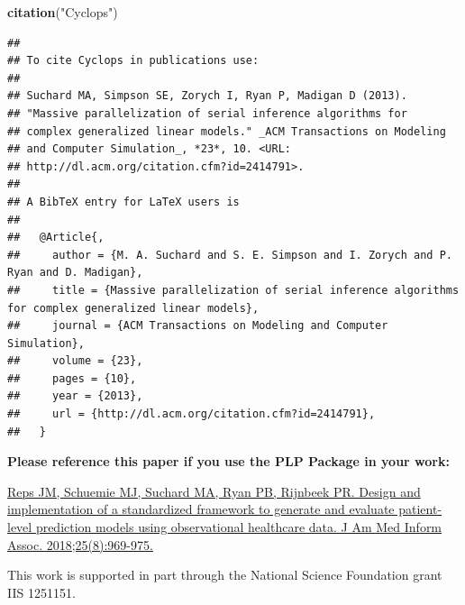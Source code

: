 \documentclass[]{article}
\newenvironment{Shaded}{\begin{snugshade}}{\end{snugshade}}
\newcommand{\KeywordTok}[1]{\textcolor[rgb]{0.13,0.29,0.53}{\textbf{#1}}}
\newcommand{\StringTok}[1]{\textcolor[rgb]{0.31,0.60,0.02}{#1}}
\newcommand{\NormalTok}[1]{#1}
\begin{document}
\begin{Shaded}
\begin{Highlighting}[]
\KeywordTok{citation}\NormalTok{(}\StringTok{"Cyclops"}\NormalTok{)}
\end{Highlighting}
\end{Shaded}

\begin{verbatim}
## 
## To cite Cyclops in publications use:
## 
## Suchard MA, Simpson SE, Zorych I, Ryan P, Madigan D (2013).
## "Massive parallelization of serial inference algorithms for
## complex generalized linear models." _ACM Transactions on Modeling
## and Computer Simulation_, *23*, 10. <URL:
## http://dl.acm.org/citation.cfm?id=2414791>.
## 
## A BibTeX entry for LaTeX users is
## 
##   @Article{,
##     author = {M. A. Suchard and S. E. Simpson and I. Zorych and P. Ryan and D. Madigan},
##     title = {Massive parallelization of serial inference algorithms for complex generalized linear models},
##     journal = {ACM Transactions on Modeling and Computer Simulation},
##     volume = {23},
##     pages = {10},
##     year = {2013},
##     url = {http://dl.acm.org/citation.cfm?id=2414791},
##   }
\end{verbatim}

\textbf{Please reference this paper if you use the PLP Package in your
work:}

\href{http://dx.doi.org/10.1093/jamia/ocy032}{Reps JM, Schuemie MJ,
Suchard MA, Ryan PB, Rijnbeek PR. Design and implementation of a
standardized framework to generate and evaluate patient-level prediction
models using observational healthcare data. J Am Med Inform Assoc.
2018;25(8):969-975.}

This work is supported in part through the National Science Foundation
grant IIS 1251151.
\end{document}

